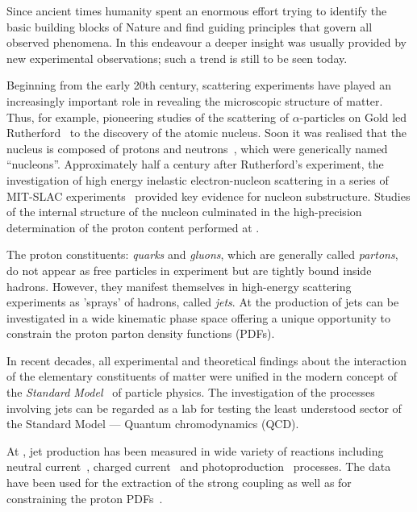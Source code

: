 Since ancient times humanity spent an enormous effort trying to identify the basic building blocks of Nature and find guiding principles that govern all observed phenomena. In this endeavour a deeper insight was usually provided by new experimental observations; such a trend is still to be seen today.

Beginning from the early 20th century, scattering experiments have played an increasingly important role in revealing the microscopic structure of matter. Thus, for example, pioneering studies of the scattering of $\alpha$-particles on Gold led Rutherford~\cite{pm:21:669} to the discovery of the atomic nucleus. Soon it was realised that the nucleus is composed of protons and neutrons~\cite{Chadwick:1932ma}, which were generically named ``nucleons''. Approximately half a century after Rutherford's experiment, the investigation of high energy inelastic electron-nucleon scattering in a series of MIT-SLAC experiments~\cite{Panofsky:1968pb, Bloom:1969kc, Briedenbach:1969, Taylor:1991ew, Kendall:1991np} provided key evidence for nucleon substructure. Studies of the internal structure of the nucleon culminated in the high-precision determination of the proton content performed at \hera.

The proton constituents: \emph{quarks} and \emph{gluons}, which are generally called \emph{partons}, do not appear as free particles in experiment but are tightly bound inside hadrons. However, they manifest themselves in high-energy scattering experiments as 'sprays' of hadrons, called \emph{jets}. At \hera the production of jets can be investigated in a wide kinematic phase space offering a unique opportunity to constrain the proton parton density functions (PDFs).

In recent decades, all experimental and theoretical findings about the interaction of the elementary constituents of matter were unified in the modern concept of the \emph{Standard Model}~\cite{PDG:2014} of particle physics. The investigation of the processes involving jets can be regarded as a lab for testing the least understood sector of the Standard Model --- Quantum chromodynamics (QCD).

At \hera, jet production has been measured in wide variety of reactions including neutral current~\cite{epj:c19:289,pl:b547:164,pl:b551:226,np:b765:1,pl:b649:12,epj:c65:363,epj:c67:1,pl:b507:70,epj:c23:13,pl:b515:17,epj:c44:183,pr:d85:052008}, charged current~\cite{epj:c31:149,pr:d78:032004} and photoproduction~\cite{pl:b560:7,epj:c29:497,epj:c11:35,epj:c23:615,pl:b531:9,epj:c25:13,pl:b639:21,pr:d76:072011,pl:b443:394,np:b792:1} processes. The data have been used for the extraction of the strong coupling as well as for constraining the proton PDFs~\cite{epj:c42:1}.

